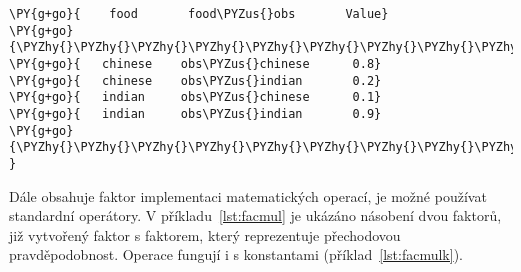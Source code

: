 \begin{example}
\begin{Verbatim}[commandchars=\\\{\}]
\PY{g+go}{    food       food\PYZus{}obs       Value}
\PY{g+go}{\PYZhy{}\PYZhy{}\PYZhy{}\PYZhy{}\PYZhy{}\PYZhy{}\PYZhy{}\PYZhy{}\PYZhy{}\PYZhy{}\PYZhy{}\PYZhy{}\PYZhy{}\PYZhy{}\PYZhy{}\PYZhy{}\PYZhy{}\PYZhy{}\PYZhy{}\PYZhy{}\PYZhy{}\PYZhy{}\PYZhy{}\PYZhy{}\PYZhy{}\PYZhy{}\PYZhy{}\PYZhy{}\PYZhy{}\PYZhy{}\PYZhy{}\PYZhy{}\PYZhy{}\PYZhy{}\PYZhy{}\PYZhy{}\PYZhy{}\PYZhy{}\PYZhy{}\PYZhy{}}
\PY{g+go}{   chinese    obs\PYZus{}chinese      0.8}
\PY{g+go}{   chinese    obs\PYZus{}indian       0.2}
\PY{g+go}{   indian     obs\PYZus{}chinese      0.1}
\PY{g+go}{   indian     obs\PYZus{}indian       0.9}
\PY{g+go}{\PYZhy{}\PYZhy{}\PYZhy{}\PYZhy{}\PYZhy{}\PYZhy{}\PYZhy{}\PYZhy{}\PYZhy{}\PYZhy{}\PYZhy{}\PYZhy{}\PYZhy{}\PYZhy{}\PYZhy{}\PYZhy{}\PYZhy{}\PYZhy{}\PYZhy{}\PYZhy{}\PYZhy{}\PYZhy{}\PYZhy{}\PYZhy{}\PYZhy{}\PYZhy{}\PYZhy{}\PYZhy{}\PYZhy{}\PYZhy{}\PYZhy{}\PYZhy{}\PYZhy{}\PYZhy{}\PYZhy{}\PYZhy{}\PYZhy{}\PYZhy{}\PYZhy{}\PYZhy{}              }
\end{Verbatim}
\caption{Zobrazení faktorů}
\label{lst:facprt}
\end{example}



Dále obsahuje faktor implementaci matematických operací, je možné používat standardní operátory.
V příkladu~\ref{lst:facmul} je ukázáno násobení dvou faktorů, již vytvořený faktor s faktorem, který reprezentuje přechodovou pravděpodobnost.
Operace fungují i s konstantami (příklad~\ref{lst:facmulk}).

